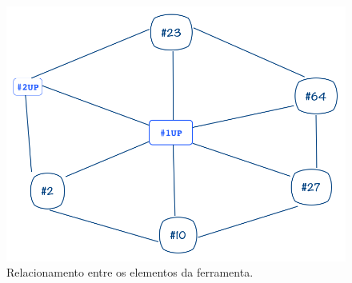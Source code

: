 \begin{figure}[h]
	\centering
		\includegraphics[keepaspectratio=true,scale=0.5]{figuras/grafo.png}
	\caption{Relacionamento entre os elementos da ferramenta.\label{fig05}
}
\end{figure}




